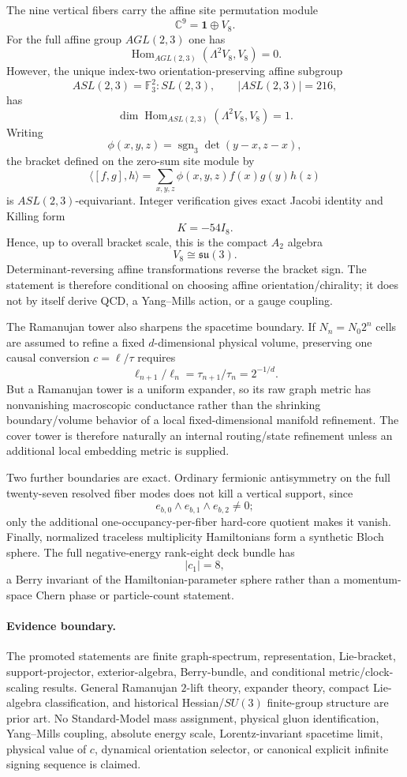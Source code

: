 The nine vertical fibers carry the affine site permutation module
\[
 \mathbb C^9=\mathbf1\oplus V_8.
\]
For the full affine group $AGL(2,3)$ one has
\[
 \operatorname{Hom}_{AGL(2,3)}(\Lambda^2V_8,V_8)=0.
\]
However, the unique index-two orientation-preserving affine subgroup
\[
 ASL(2,3)=\mathbb F_3^2\!:\!SL(2,3),\qquad |ASL(2,3)|=216,
\]
has
\[
 \dim\operatorname{Hom}_{ASL(2,3)}(\Lambda^2V_8,V_8)=1.
\]
Writing
\[
 \phi(x,y,z)=\operatorname{sgn}_3\det(y-x,z-x),
\]
the bracket defined on the zero-sum site module by
\[
 \langle[f,g],h\rangle
 =\sum_{x,y,z}\phi(x,y,z)f(x)g(y)h(z)
\]
is $ASL(2,3)$-equivariant.  Integer verification gives exact Jacobi identity and Killing form
\[
 \boxed{K=-54I_8}.
\]
Hence, up to overall bracket scale, this is the compact $A_2$ algebra
\[
 \boxed{V_8\cong\mathfrak{su}(3)}.
\]
Determinant-reversing affine transformations reverse the bracket sign.  The statement is therefore conditional on choosing affine orientation/chirality; it does not by itself derive QCD, a Yang--Mills action, or a gauge coupling.

The Ramanujan tower also sharpens the spacetime boundary.  If $N_n=N_0 2^n$ cells are assumed to refine a fixed $d$-dimensional physical volume, preserving one causal conversion $c=\ell/\tau$ requires
\[
 \ell_{n+1}/\ell_n=\tau_{n+1}/\tau_n=2^{-1/d}.
\]
But a Ramanujan tower is a uniform expander, so its raw graph metric has nonvanishing macroscopic conductance rather than the shrinking boundary/volume behavior of a local fixed-dimensional manifold refinement.  The cover tower is therefore naturally an internal routing/state refinement unless an additional local embedding metric is supplied.

Two further boundaries are exact.  Ordinary fermionic antisymmetry on the full twenty-seven resolved fiber modes does not kill a vertical support, since
\[
 e_{b,0}\wedge e_{b,1}\wedge e_{b,2}\ne0;
\]
only the additional one-occupancy-per-fiber hard-core quotient makes it vanish.  Finally, normalized traceless multiplicity Hamiltonians form a synthetic Bloch sphere.  The full negative-energy rank-eight deck bundle has
\[
 \boxed{|c_1|=8},
\]
a Berry invariant of the Hamiltonian-parameter sphere rather than a momentum-space Chern phase or particle-count statement.

\paragraph{Evidence boundary.}
The promoted statements are finite graph-spectrum, representation, Lie-bracket, support-projector, exterior-algebra, Berry-bundle, and conditional metric/clock-scaling results.  General Ramanujan $2$-lift theory, expander theory, compact Lie-algebra classification, and historical Hessian/$SU(3)$ finite-group structure are prior art.  No Standard-Model mass assignment, physical gluon identification, Yang--Mills coupling, absolute energy scale, Lorentz-invariant spacetime limit, physical value of $c$, dynamical orientation selector, or canonical explicit infinite signing sequence is claimed.
